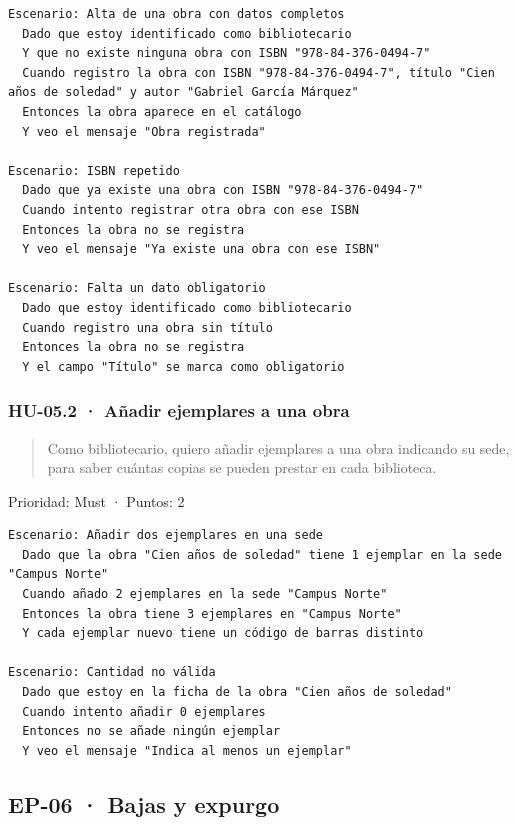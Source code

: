 \documentclass[11pt,a4paper]{article}
\begin{document}
\begin{Verbatim}[breaklines,fontsize=\small,frame=single,framerule=0.4pt,rulecolor=\color{black!25}]
Escenario: Alta de una obra con datos completos
  Dado que estoy identificado como bibliotecario
  Y que no existe ninguna obra con ISBN "978-84-376-0494-7"
  Cuando registro la obra con ISBN "978-84-376-0494-7", título "Cien años de soledad" y autor "Gabriel García Márquez"
  Entonces la obra aparece en el catálogo
  Y veo el mensaje "Obra registrada"

Escenario: ISBN repetido
  Dado que ya existe una obra con ISBN "978-84-376-0494-7"
  Cuando intento registrar otra obra con ese ISBN
  Entonces la obra no se registra
  Y veo el mensaje "Ya existe una obra con ese ISBN"

Escenario: Falta un dato obligatorio
  Dado que estoy identificado como bibliotecario
  Cuando registro una obra sin título
  Entonces la obra no se registra
  Y el campo "Título" se marca como obligatorio
\end{Verbatim}

\subsubsection*{HU-05.2 · Añadir ejemplares a una obra}

\begin{quote}
Como bibliotecario, quiero añadir ejemplares a una obra indicando su sede, para saber cuántas copias se pueden prestar en cada biblioteca.
\end{quote}

Prioridad: Must · Puntos: 2

\begin{Verbatim}[breaklines,fontsize=\small,frame=single,framerule=0.4pt,rulecolor=\color{black!25}]
Escenario: Añadir dos ejemplares en una sede
  Dado que la obra "Cien años de soledad" tiene 1 ejemplar en la sede "Campus Norte"
  Cuando añado 2 ejemplares en la sede "Campus Norte"
  Entonces la obra tiene 3 ejemplares en "Campus Norte"
  Y cada ejemplar nuevo tiene un código de barras distinto

Escenario: Cantidad no válida
  Dado que estoy en la ficha de la obra "Cien años de soledad"
  Cuando intento añadir 0 ejemplares
  Entonces no se añade ningún ejemplar
  Y veo el mensaje "Indica al menos un ejemplar"
\end{Verbatim}

\subsection*{EP-06 · Bajas y expurgo}
\end{document}
